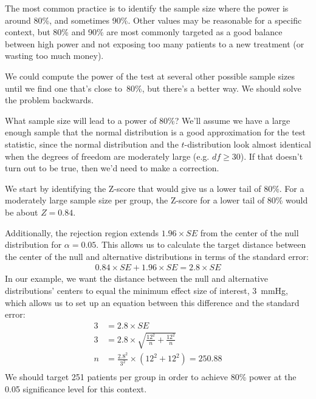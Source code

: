 The most common practice is to identify the sample size where
the power is around 80\%, and sometimes 90\%.
Other values may be reasonable for a specific context,
but 80\% and 90\% are most commonly targeted as a good
balance between high power and not exposing too many
patients to a new treatment (or wasting too much money).

We could compute the power of the test at several other
possible sample sizes until we find one that's close to~80\%,
but there's a better way.
We should solve the problem backwards.

\begin{examplewrap}
\begin{nexample}{What sample size will lead to a power of 80\%?}
  \label{sample_size_for_80_percent_power}%
  We'll assume we have a large enough sample that the normal
  distribution is a good approximation for the test statistic,
  since the normal distribution and the $t$-distribution
  look almost identical when the degrees of freedom are
  moderately large (e.g. $df \geq 30$).
  If that doesn't turn out to be true, then we'd need to make
  a correction.

  We start by identifying the Z-score that would give us a lower
  tail of 80\%.
  For a moderately large sample size per group,
  the Z-score for a lower tail of 80\% would be about $Z = 0.84$.
  \begin{center}
  \end{center}
  Additionally, the rejection region extends
  $1.96\times SE$ from the center of the null distribution
  for $\alpha = 0.05$.
  This allows us to calculate the target distance between
  the center of the null and alternative distributions in
  terms of the standard error:
  \begin{align*}
  0.84 \times SE + 1.96 \times SE = 2.8 \times SE
  \end{align*}
  In our example, we want the distance between the null
  and alternative distributions' centers to equal the minimum
  effect size of interest, 3~mmHg, which allows us to set up
  an equation between this difference and the standard error:
  \begin{align*}
  3 &= 2.8 \times SE \\
  3 &= 2.8 \times \sqrt{\frac{12^2}{n} + \frac{12^2}{n}} \\
  n &= \frac{2.8^2}{3^2} \times \left( 12^2 + 12^2 \right)
    = 250.88 \\
  \end{align*}
  We should target 251 patients per group in order to achieve
  80\% power at the 0.05 significance level for this context.
\end{nexample}
\end{examplewrap}

